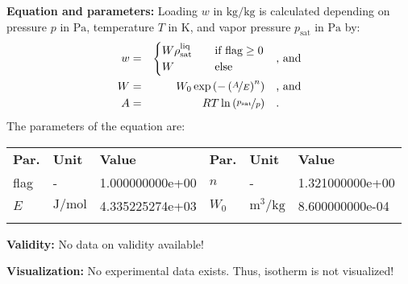 \textbf{Equation and parameters:}
\newline
%
Loading $w$ in $\si{\kilogram\per\kilogram}$ is calculated depending on pressure $p$ in $\si{\pascal}$, temperature $T$ in $\si{\kelvin}$, and vapor pressure $p_\mathrm{sat}$ in $\si{\pascal}$ by:
%
\begin{equation*}
\begin{split}
w &=& \begin{cases} W \rho_\mathrm{sat}^{\mathrm{liq}} & \quad \text{if flag} \geq 0 \\ W & \quad \text{else} \end{cases} & \quad\text{, and} \\
W &=& W_0 \exp \left( - \left( \nicefrac{A}{E} \right) ^{n} \right) & \quad\text{, and} \\
A &=& R T \ln \left( \nicefrac{p_\mathrm{sat}}{p} \right) & \quad\text{.} \\
\end{split}
\end{equation*}
%
The parameters of the equation are:
%
\begin{longtable}[l]{lll|lll}
\toprule
\addlinespace
\textbf{Par.} & \textbf{Unit} & \textbf{Value} &	\textbf{Par.} & \textbf{Unit} & \textbf{Value} \\
\addlinespace
\midrule
\endhead

\bottomrule
\endfoot
\bottomrule
\endlastfoot
\addlinespace

flag & - & 1.000000000e+00 & $n$ & - & 1.321000000e+00 \\
$E$ & $\si{\joule\per\mole}$ & 4.335225274e+03 & $W_0$ & $\si{\cubic\meter\per\kilogram}$ & 8.600000000e-04 \\

\addlinespace\end{longtable}

\textbf{Validity:}
\newline
No data on validity available!
\newline

\textbf{Visualization:}
%
\newline
No experimental data exists. Thus, isotherm is not visualized!
%

\FloatBarrier
\newpage

